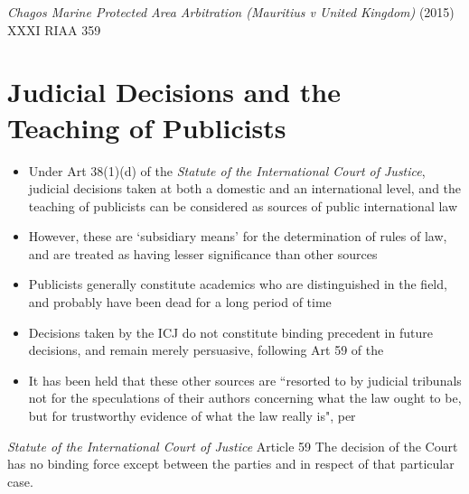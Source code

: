 \begin{casedetails}{\textit{Chagos Marine Protected Area Arbitration (Mauritius v United Kingdom)} (2015) XXXI RIAA 359}
\end{casedetails}

\section{Judicial Decisions and the Teaching of Publicists}
\begin{itemize}
    \item Under Art 38(1)(d) of the \textit{Statute of the International Court of Justice}, judicial decisions taken at both a domestic and an international level, and the teaching of publicists can be considered as sources of public international law
    \item However, these are `subsidiary means' for the determination of rules of law, and are treated as having lesser significance than other sources
    \item Publicists generally constitute academics who are distinguished in the field, and probably have been dead for a long period of time
    \item Decisions taken by the ICJ do not constitute binding precedent in future decisions, and remain merely persuasive, following Art 59 of the 
    \item It has been held that these other sources are ``resorted to by judicial tribunals not for the speculations of their authors concerning what the law ought to be, but for trustworthy evidence of what the law really is", per 
\end{itemize}
\begin{statutedetails}{\textit{Statute of the International Court of Justice} Article 59}
    \flushleft
    The decision of the Court has no binding force except between the parties and in respect of that particular case.
\end{statutedetails}

